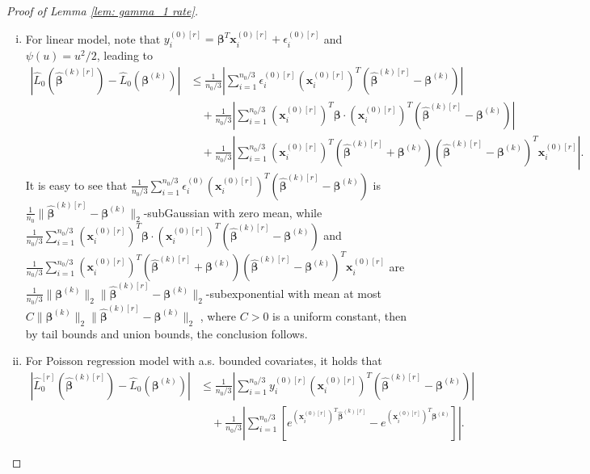 \documentclass[12pt]{article}
\newcommand{\twonorm}[1]{\|#1\|_{2}}
\newcommand{\norma}[1]{\left|#1\right|}
\newcommand{\norm}[1]{|#1|}
\newcommand{\bbeta}{\bm{\beta}}
\newcommand{\hbeta}{\hat{\bm{\beta}}}
\newcommand{\bbetak}[1]{\bm{\beta}^{(#1)}}
\newcommand{\bx}{\bm{x}}
\newcommand{\by}{\bm{y}}
\newcommand{\bX}{\bm{X}}
\newcommand{\<}{\langle}
\renewcommand{\>}{\rangle}
\begin{document}
\begin{proof}[Proof of Lemma \ref{lem: gamma_1 rate}]
\begin{enumerate}[(i)]
		implying that
		\begin{equation}
			\frac{1}{n_0/3}\norm{(\by^{(0)[r]})^T \bX^{(0)[r]}(\hbeta^{(k)[r]}-\bbetak{k})}  \lesssim \left(1+\sqrt{\frac{1}{n_0}}\cdot \zeta\right)\cdot\twonorm{\hbeta^{(k)[r]}-\bbetak{k}},
		\end{equation}
		with probability at least $1-\exp\{-\zeta^2\}$.
		On the other hand, the second term can be bounded by $\frac{C}{n_0/3}\sum_{i=1}^{n_0/3}\norm{(\bx_i^{(0)[r]})^T(\hbeta^{(k)[r]}-\bbetak{k})}$, which can be similarly bounded as the first term, leading to the desired conclusion.
		\item For linear model, note that $y_i^{(0)[r]} = \bbeta^T\bx^{(0)[r]}_i + \epsilon^{(0)[r]}_i$ and $\psi(u) = u^2/2$, leading to
		\begin{align}
			\norm{\hat{L}_0(\hbeta^{(k)[r]}) - \hat{L}_0(\bbetak{k})} &\leq \frac{1}{n_0/3}\norma{\sum_{i=1}^{n_0/3}\epsilon_i^{(0)[r]}(\bx^{(0)[r]}_i)^T(\hbeta^{(k)[r]}-\bbetak{k})} \\
			&\quad + \frac{1}{n_0/3}\norma{\sum_{i=1}^{n_0/3}(\bx^{(0)[r]}_i)^T \bbeta \cdot (\bx^{(0)[r]}_i)^T(\hbeta^{(k)[r]}-\bbetak{k})} \\
			&\quad + \frac{1}{n_0/3}\norma{\sum_{i=1}^{n_0/3}(\bx^{(0)[r]}_i)^T(\hbeta^{(k)[r]}+\bbeta^{(k)})(\hbeta^{(k)[r]}-\bbeta^{(k)})^T\bx^{(0)[r]}_i}.
		\end{align}
		It is easy to see that $\frac{1}{n_0/3}\sum_{i=1}^{n_0/3}\epsilon_i^{(0)}(\bx^{(0)[r]}_i)^T(\hbeta^{(k)[r]}-\bbetak{k})$ is $\frac{1}{n_0}\twonorm{\hbeta^{(k)[r]}-\bbetak{k}}$-subGaussian with zero mean, while $\frac{1}{n_0/3}\sum_{i=1}^{n_0/3}(\bx^{(0)[r]}_i)^T \bbeta \cdot (\bx^{(0)[r]}_i)^T(\hbeta^{(k)[r]}-\bbetak{k})$ and $\frac{1}{n_0/3}\sum_{i=1}^{n_0/3}(\bx^{(0)[r]}_i)^T(\hbeta^{(k)[r]}+\bbetak{k})(\hbeta^{(k)[r]}-\bbetak{k})^T\bx^{(0)[r]}_i$ are $\frac{1}{n_0/3}\twonorm{\bbetak{k}}\twonorm{\hbeta^{(k)[r]}-\bbetak{k}}$-subexponential with mean at most $C\twonorm{\bbetak{k}}\twonorm{\hbeta^{(k)[r]}-\bbetak{k}}$ \citep{vershynin2018high}, where $C>0$ is a uniform constant, then by tail bounds and union bounds, the conclusion follows.
		\item For Poisson regression model with a.s. bounded covariates, it holds that
		\begin{align}
			\norm{\hat{L}_0^{[r]}(\hbeta^{(k)[r]}) - \hat{L}_0(\bbetak{k})} &\leq \frac{1}{n_0/3}\norma{\sum_{i=1}^{n_0/3}y_i^{(0)[r]}(\bx^{(0)[r]}_i)^T(\hbeta^{(k)[r]}-\bbetak{k})} \\
			&\quad + \frac{1}{n_0/3}\norma{\sum_{i=1}^{n_0/3}[e^{(\bx^{(0)[r]}_i)^T \hbeta^{(k)[r]}}-e^{(\bx^{(0)[r]}_i)^T \bbetak{k}}]}.

\end{align}
\end{enumerate}
\end{proof}
\end{document}

